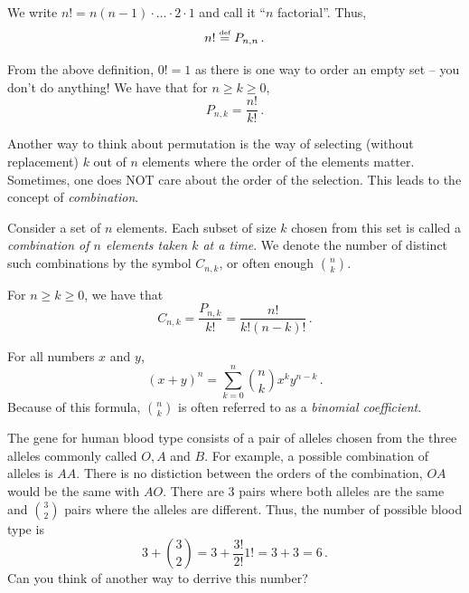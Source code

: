\begin{definition}[Factorial]
    We write $n! = n(n-1)\cdot \dots \cdot 2 \cdot 1$ and call it ``$n$ factorial''.
    Thus, 
    \begin{equation*}
        n! \stackrel{\scriptscriptstyle\textup{def}}{=} P_{n,n} \,.
    \end{equation*}
\end{definition}

\begin{example}
    From the above definition, $0! = 1$ as there is one way to order an empty set 
    -- you don't do anything!
   We have that for $n \geq k \geq 0$,
   \begin{equation*}
       P_{n,k} = \frac{n!}{k!} \,.
   \end{equation*}
\end{example}

Another way to think about permutation is the way of 
selecting (without replacement) $k$ out of $n$ elements where the order of the elements matter.
Sometimes, one does NOT care about the order of the selection. 
This leads to the concept of \emph{combination}.

\begin{definition}
    Consider a set of $n$ elements. Each subset of size $k$ chosen from this set
    is called a \emph{combination of $n$ elements taken $k$ at a time}.
    We denote the number of distinct such combinations by the symbol
    $C_{n,k}$, or often enough $\binom nk$.
\end{definition}

\begin{theorem}
    For $n\geq k \geq 0$, we have that
   \begin{equation*}
       C_{n,k} = \frac{P_{n,k}}{k!} = \frac{n!}{k!(n-k)!} \,.
   \end{equation*}
\end{theorem}

\begin{theorem}
    For all numbers $x$ and $y$,
    \begin{equation*}
        (x+y)^n = \sum_{k=0}^n \binom nk x^{k}y^{n-k} \,.
    \end{equation*}
    Because of this formula, $\binom nk$ is often referred to as a 
    \emph{binomial coefficient}.
\end{theorem}

\begin{example}
    \label{ex:blood}
   The gene for human blood type consists of a pair of alleles chosen from
   the three alleles commonly called $O, A$ and $B$.
   For example, a possible combination of alleles is $AA$.
   There is no distiction between the orders of the combination, $OA$ would
   be the same with $AO$.
   There are $3$ pairs where both alleles are the same and
   $\binom 32$ pairs where the alleles are different.
   Thus, the number of possible blood type is
   \begin{equation*}
       3 + \binom 32 = 3 + \frac{3!}{2!}{1!} = 3+ 3 = 6\,.
   \end{equation*}
   Can you think of another way to derrive this number?
\end{example}

